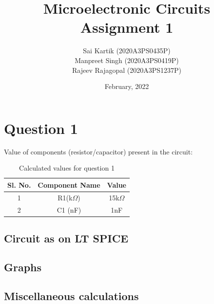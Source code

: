 \documentclass{article}[12pt]
\title{Microelectronic Circuits Assignment 1}
\author{Sai Kartik (2020A3PS0435P)\\ Manpreet Singh (2020A3PS0419P)\\ Rajeev Rajagopal (2020A3PS1237P)}
\date{February, 2022}
\begin{document}
\maketitle
\section*{Question 1}
Value of components (resistor/capacitor) present in the circuit:
\begin{table}[ht]
    \centering
    \caption{Calculated values for question 1}
    \begin{tabular}{|c | c | c|}
        \hline
        Sl. No. & Component Name & Value       \\
        \hline
        1       & R1(k$\Omega$)  & 15k$\Omega$ \\ %
        2       & C1 (nF)        & 1nF         \\ %
        \hline
    \end{tabular}
    \label{tab:values1}
\end{table}
\subsection*{Circuit as on LT SPICE}
\subsection*{Graphs}
\subsection*{Miscellaneous calculations}
\newpage
\end{document}
